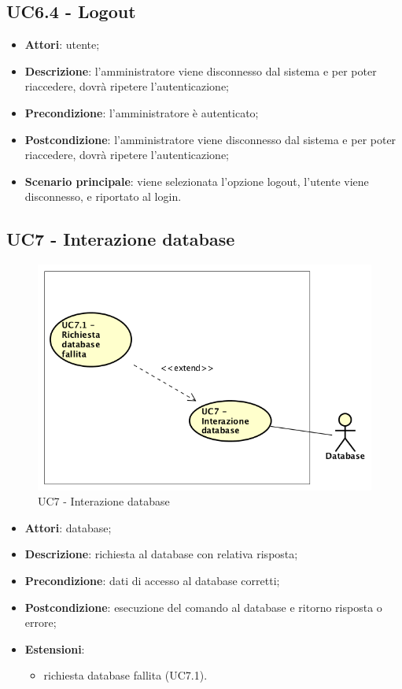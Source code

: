 \documentclass[../AnalisiDeiRequisiti.tex]{subfiles}
\begin{document}
\subsection{UC6.4 - Logout} 
\label{sssec:UC6.4} 
\begin{itemize} 
\item \textbf{Attori}: utente;
\item \textbf{Descrizione}: l'amministratore viene disconnesso dal sistema e per poter riaccedere, dovrà ripetere l'autenticazione;
\item \textbf{Precondizione}: l'amministratore è autenticato;
\item \textbf{Postcondizione}: l'amministratore viene disconnesso dal sistema e per poter riaccedere, dovrà ripetere l'autenticazione;
\item \textbf{Scenario principale}: viene selezionata l'opzione logout, l'utente viene disconnesso, e riportato al login.\end{itemize} 
\newpage
\subsection{UC7 - Interazione database}
\begin{figure}[!h]
	\centering
	\includegraphics[width=\textwidth]{UseCases/UC7-InterazioneDB/UC7.png}
	\caption{UC7 - Interazione database}
\end{figure}
\label{sssec:UC7} 
\begin{itemize} 
\item \textbf{Attori}: database;
\item \textbf{Descrizione}: richiesta al database con relativa risposta;
\item \textbf{Precondizione}: dati di accesso al database corretti;
\item \textbf{Postcondizione}: esecuzione del comando al database e ritorno risposta o errore;
\item \textbf{Estensioni}:\begin{itemize}\item richiesta database fallita (UC7.1).\end{itemize}
\end{itemize} 
\end{document}

